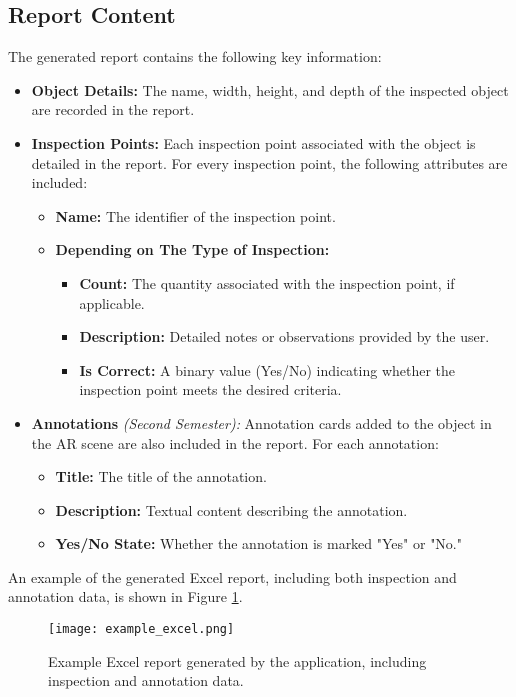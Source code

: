 \subsection{Report Content}
The generated report contains the following key information:
\begin{itemize}
    \item \textbf{Object Details:} The name, width, height, and depth of the inspected object are recorded in the report.
    \item \textbf{Inspection Points:} Each inspection point associated with the object is detailed in the report. For every inspection point, the following attributes are included:
    \begin{itemize}
        \item \textbf{Name:} The identifier of the inspection point.
        \item \textbf{Depending on The Type of Inspection:}
        \begin{itemize}
            \item \textbf{Count:} The quantity associated with the inspection point, if applicable.
            \item \textbf{Description:} Detailed notes or observations provided by the user.
            \item \textbf{Is Correct:} A binary value (Yes/No) indicating whether the inspection point meets the desired criteria.
        \end{itemize}
    \end{itemize}
    \item \textbf{Annotations} \textit{(Second Semester):} Annotation cards added to the object in the AR scene are also included in the report. For each annotation:
    \begin{itemize}
        \item \textbf{Title:} The title of the annotation.
        \item \textbf{Description:} Textual content describing the annotation.
        \item \textbf{Yes/No State:} Whether the annotation is marked "Yes" or "No."
    \end{itemize}
\end{itemize}

An example of the generated Excel report, including both inspection and annotation data, is shown in Figure \ref{fig:example_excel}.

\begin{figure}[H]
    \centering
    \texttt{[image: example\_excel.png]} %
    \caption{Example Excel report generated by the application, including inspection and annotation data.}
    \label{fig:example_excel}
\end{figure}

